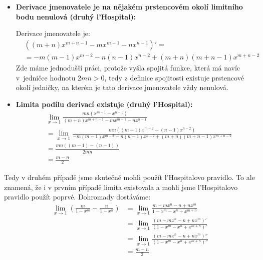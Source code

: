 \begin{enumerate}
{\begin{itemize}
					\begin{itemize}

						\item  \textbf{Derivace jmenovatele je na nějakém prstencovém okolí limitního bodu nenulová (druhý l'Hospital):}

							Derivace jmenovatele je:
							\begin{align*}
								&\left( (m+n)x^{m+n-1} - mx^{m-1} - nx^{n-1} \right)' = \\ &= -m(m-1)x^{m-2} -n(n-1)x^{n-2} + (m+n)(m+n-1)x^{m+n-2}
							\end{align*}
							Zde máme jednodušší práci, protože vyšla spojitá funkce, která má navíc v~jedničce hodnotu $2mn > 0$, tedy z definice spojitosti existuje prstencové okolí jedničky, na kterém je tato derivace jmenovatele vždy nenulová.

						\item  \textbf{Limita podílu derivací existuje (druhý l'Hospital):}
							\begin{align*}
								&\lim_{x \rightarrow 1} \frac{mn\left( x^{m-1} - x^{n-1} \right)}{(m+n)x^{m+n-1} - mx^{m-1} - nx^{n-1}} \\
								&= \lim_{x \rightarrow 1} \frac{mn\left( (m-1)x^{m-2} - (n-1)x^{n-2} \right)}{-m(m-1)x^{m-2} -n(n-1)x^{n-2} + (m+n)(m+n-1)x^{m+n-2}} \\
								&= \frac{mn((m-1) -(n-1))}{2mn} \\
								&= \frac{m-n}{2}
							\end{align*}

					\end{itemize}
			\end{itemize}

			Tedy v druhém případě jsme skutečně mohli použít l'Hospitalovo pravidlo.
			To ale znamená, že i v prvním případě limita existovala a mohli jsme l'Hospitalovo pravidlo použít poprvé.
			Dohromady dostáváme:
			\begin{align*}
				\lim_{x \rightarrow 1} \left( \frac{m}{1 - x^m} - \frac{n}{1-x^n} \right) &= \lim_{x \rightarrow 1} \frac{m - mx^n - n + nx^m}{1 - x^m - x^n + x^{m+n}} \\
				&= \lim_{x \rightarrow 1} \frac{(m - mx^n - n + nx^m)'}{(1 - x^m - x^n + x^{m+n})'} \\
				&= \lim_{x \rightarrow 1} \frac{(m - mx^n - n + nx^m)''}{(1 - x^m - x^n + x^{m+n})''} \\
				&= \frac{m-n}{2}
			\end{align*}
		}

\end{enumerate}

